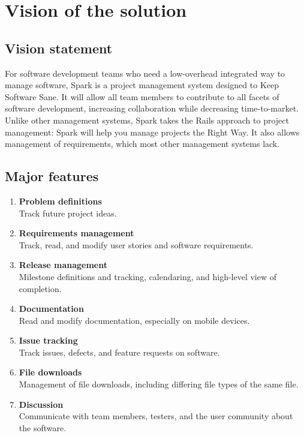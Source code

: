 
\section{Vision of the solution}
\sectionrule


\subsection{Vision statement}
\subsectionrule

For software development teams who need a low-overhead integrated way to manage software, Spark is a project management system designed to Keep Software Sane. It will allow all team members to contribute to all facets of software development, increasing collaboration while decreasing time-to-market. Unlike other management systems, Spark takes the Rails approach to project management: Spark will help you manage projects the Right Way. It also allows management of requirements, which most other management systems lack.


\subsection{Major features}
\subsectionrule

\begin{enumerate}[FE-1]
\item{\textbf{Problem definitions} \\
	Track future project ideas.}
\item{\textbf{Requirements management} \\
	Track, read, and modify user stories and software requirements.}
\item{\textbf{Release management} \\
	Milestone definitions and tracking, calendaring, and high-level view of completion.}
\item{\textbf{Documentation} \\
	Read and modify documentation, especially on mobile devices.}
\item{\textbf{Issue tracking} \\
	Track issues, defects, and feature requests on software.}
\item{\textbf{File downloads} \\
	Management of file downloads, including differing file types of the same file.}
\item{\textbf{Discussion} \\
	Communicate with team members, testers, and the user community about the software.}
\end{enumerate}
